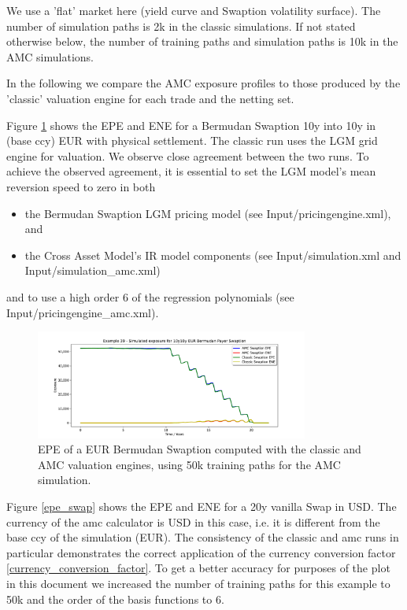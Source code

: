 \documentclass[12pt, a4paper]{article}
\begin{document}
We use a 'flat' market here (yield curve and Swaption volatility surface). The number of simulation paths is 2k in the classic simulations. If not stated otherwise below, the number of training paths and simulation paths is 10k in the AMC simulations. 

In the following we compare the AMC exposure profiles to those produced by the 'classic' valuation engine for each trade and the netting set. 

Figure \ref{epe_swaption} shows the EPE and ENE for a Bermudan Swaption 10y into 10y in (base ccy) EUR with physical settlement. The classic run uses
the LGM grid engine for valuation. We observe close agreement between the two runs. To achieve the observed agreement, it is essential to set the LGM model's mean reversion speed to zero in both
\begin{itemize}
\item the Bermudan Swaption LGM pricing model (see Input/pricingengine.xml), and
\item the Cross Asset Model's IR model components (see Input/simulation.xml and Input/simulation\_amc.xml) 
\end{itemize}
and to use a high order 6 of the regression polynomials (see Input/pricingengine\_amc.xml).
 
\begin{figure}
  \includegraphics[width=0.8\textwidth]{mpl_amc_bermudanswaption.pdf}
  \caption{EPE of a EUR Bermudan Swaption computed with the classic and AMC valuation engines, using 50k training paths for the AMC simulation.}
  \label{epe_swaption}
\end{figure}

Figure \ref{epe_swap} shows the EPE and ENE for a 20y vanilla Swap in USD. The currency of
the amc calculator is USD in this case, i.e. it is different from the base ccy of the simulation (EUR). The consistency
of the classic and amc runs in particular demonstrates the correct application of the currency conversion factor
\ref{currency_conversion_factor}. To get a better accuracy for purposes of the plot in this document we increased the
number of training paths for this example to 50k and the order of the basis functions to 6.
\end{document}
